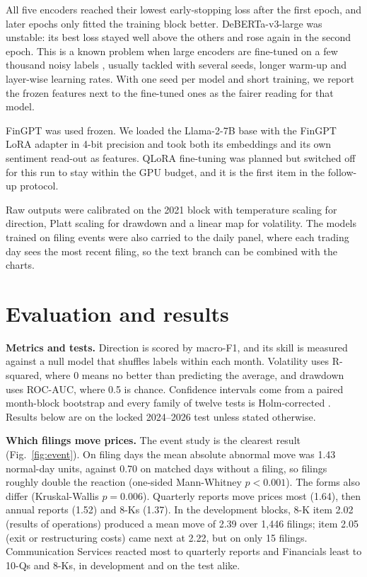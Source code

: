 \documentclass[11pt,a4paper]{article}
\begin{document}
All five encoders reached their lowest early-stopping loss after the first epoch, and later epochs only fitted the training block better. DeBERTa-v3-large was unstable: its best loss stayed well above the others and rose again in the second epoch. This is a known problem when large encoders are fine-tuned on a few thousand noisy labels \cite{dodge2020,mosbach2021}, usually tackled with several seeds, longer warm-up and layer-wise learning rates. With one seed per model and short training, we report the frozen features next to the fine-tuned ones as the fairer reading for that model.

FinGPT was used frozen. We loaded the Llama-2-7B base with the FinGPT LoRA adapter in 4-bit precision and took both its embeddings and its own sentiment read-out as features. QLoRA fine-tuning \cite{dettmers2023} was planned but switched off for this run to stay within the GPU budget, and it is the first item in the follow-up protocol.

Raw outputs were calibrated on the 2021 block with temperature scaling for direction, Platt scaling for drawdown and a linear map for volatility. The models trained on filing events were also carried to the daily panel, where each trading day sees the most recent filing, so the text branch can be combined with the charts.

\section{Evaluation and results}

\textbf{Metrics and tests.} Direction is scored by macro-F1, and its skill is measured against a null model that shuffles labels within each month. Volatility uses R-squared, where 0 means no better than predicting the average, and drawdown uses ROC-AUC, where 0.5 is chance. Confidence intervals come from a paired month-block bootstrap \cite{kunsch1989} and every family of twelve tests is Holm-corrected \cite{holm1979}. Results below are on the locked 2024--2026 test unless stated otherwise.

\textbf{Which filings move prices.} The event study is the clearest result (Fig.~\ref{fig:event}). On filing days the mean absolute abnormal move was 1.43 normal-day units, against 0.70 on matched days without a filing, so filings roughly double the reaction (one-sided Mann-Whitney $p < 0.001$). The forms also differ (Kruskal-Wallis $p = 0.006$). Quarterly reports move prices most (1.64), then annual reports (1.52) and 8-Ks (1.37). In the development blocks, 8-K item 2.02 (results of operations) produced a mean move of 2.39 over 1,446 filings; item 2.05 (exit or restructuring costs) came next at 2.22, but on only 15 filings. Communication Services reacted most to quarterly reports and Financials least to 10-Qs and 8-Ks, in development and on the test alike.
\end{document}
